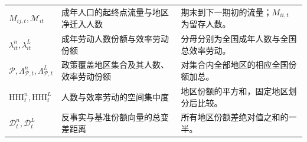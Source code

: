 \documentclass[UTF8,a4paper,zihao=-4,fontset=windows]{ctexart}
\numberwithin{equation}{section}
\begin{document}
\begin{longtable}{L{0.23\textwidth}L{0.43\textwidth}L{0.24\textwidth}}
$M_{ij,t},\mathcal M_{it}$ & 成年人口的起终点流量与地区净迁入人数 & 期末到下一期初的流量；$M_{ii,t}$ 为留存人数。\\
$\lambda^n_{it},\lambda^L_{it}$ & 成年劳动人数份额与效率劳动份额 & 分母分别为全国成年人数与全国总效率劳动。\\
$\mathcal P,\Lambda^n_{\mathcal P,t},\Lambda^L_{\mathcal P,t}$ & 政策覆盖地区集合及其人数、效率劳动份额 & 对集合内全部地区的相应全国份额加总。\\
$\mathrm{HHI}^n_t,\mathrm{HHI}^L_t$ & 人数与效率劳动的空间集中度 & 地区份额的平方和，固定地区划分后比较。\\
$\mathcal D^n_t,\mathcal D^L_t$ & 反事实与基准份额向量的总变差距离 & 所有地区份额差绝对值之和的一半。\\
\end{longtable}
\normalsize
\end{document}
